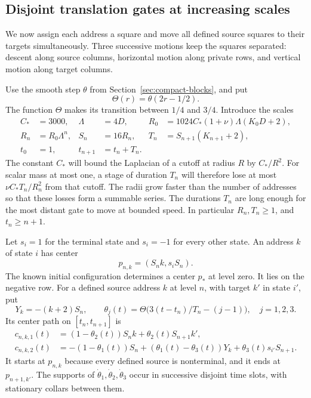 \subsection{Disjoint translation gates at increasing scales}
\label{cbe:gates}

We now assign each address a square and move all defined source
squares to their targets simultaneously.  Three successive motions
keep the squares separated: descent along source columns, horizontal
motion along private rows, and vertical motion along target columns.

Use the smooth step $\theta$ from Section~\ref{sec:compact-blocks}, and put
\[
 \Theta(r)=\theta(2r-1/2).
\]
The function $\Theta$ makes its transition between
$1/4$ and $3/4$.  Introduce the scales
\begin{equation}\label{cbe:scales}
\begin{aligned}
 C_*&=3000,&\Lambda&=4D,
 &R_0&=1024C_*(1+\nu)\Lambda(K_0D+2),\\
 R_n&=R_0\Lambda^n,&S_n&=16R_n,
 &T_n&=S_{n+1}(K_{n+1}+2),\\
 t_0&=1,&t_{n+1}&=t_n+T_n.
\end{aligned}
\end{equation}
The constant $C_*$ will bound the Laplacian of a cutoff at radius
$R$ by $C_*/R^2$. For scalar mass at most one, a stage of duration
$T_n$ will therefore lose at most $\nu C_*T_n/R_n^2$ from that
cutoff. The radii grow faster than the number of addresses so that
these losses form a summable series. The durations $T_n$ are long
enough for the most distant gate to move at bounded speed.
In particular $R_n,T_n\ge1$, and $t_n\ge n+1$.

Let $s_i=1$ for the terminal state and $s_i=-1$ for every other state.
An address $k$ of state $i$ has center
\[
 p_{n,k}=(S_nk,s_iS_n).
\]
The known initial configuration determines a center $p_*$ at level
zero.  It lies on the negative row.  For a defined source address $k$
at level $n$, with target $k'$ in state $i'$, put
\[
 Y_k=-(k+2)S_n,\qquad
 \theta_j(t)=\Theta\bigl(3(t-t_n)/T_n-(j-1)\bigr),
 \quad j=1,2,3.
\]
Its center path on $[t_n,t_{n+1}]$ is
\begin{equation}\label{cbe:path}
\begin{aligned}
 c_{n,k,1}(t)&=(1-\theta_2(t))S_nk
                         +\theta_2(t)S_{n+1}k',\\
 c_{n,k,2}(t)&=-(1-\theta_1(t))S_n
            +(\theta_1(t)-\theta_3(t))Y_k
                         +\theta_3(t)s_{i'}S_{n+1}.
\end{aligned}
\end{equation}
It starts at $p_{n,k}$ because every defined source is nonterminal,
and it ends at $p_{n+1,k'}$.  The supports of
$\dot\theta_1,\dot\theta_2,\dot\theta_3$ occur in successive
disjoint time slots, with stationary collars between them.

